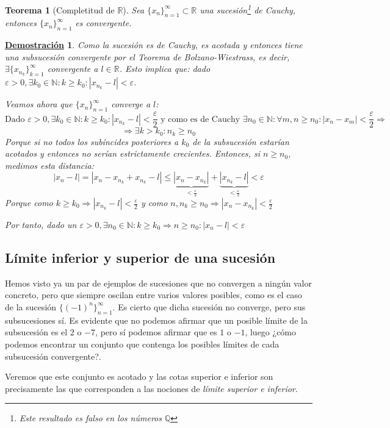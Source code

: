 \documentclass[10pt,a4paper,openright]{book}
\theoremstyle{break}
\newtheorem{theo}{Teorema}[chapter]
\newtheorem*{demo}{\underline{Demostración}}
\begin{document}
\begin{theo}[Completitud de $\mathbb R$]
Sea $\{x_n\}_{n=1}^\infty\subset \mathbb R$ una sucesión\footnote{Este resultado es falso en los números $\mathbb Q$} de Cauchy, entonces $\{x_n\}_{n=1}^\infty$ es convergente.
\end{theo}
\begin{demo}
Como la sucesión es de Cauchy, es acotada y entonces tiene una subsucesión convergente por el Teorema de Bolzano-Wiestrass, es decir, $\exists \{x_{n_k}\}_{k=1}^\infty$ convergente a $l\in \mathbb R$. Esto implica que: dado $\varepsilon>0, \exists k_0\in \mathbb N: k\geq k_0: |x_{n_k}-l|<\varepsilon$.\par

Veamos ahora que $\{x_n\}_{n=1}^\infty$ converge a $l$:
$$\mbox{Dado }\varepsilon>0, \exists k_0\in \mathbb N: k\geq k_0: |x_{n_k}-l|<\frac{\varepsilon}{2}\mbox{ y como es de Cauchy }\exists n_0\in\mathbb N: \forall m,n\geq n_0: |x_n-x_m|<\frac{\varepsilon}{2}\Rightarrow$$
$$\Rightarrow \exists k>k_0: n_k\geq n_0$$
Porque si no todos los subíncides posteriores a $k_0$ de la subsucesión estarían acotados y entonces no serían estrictamente crecientes.
Entonces, si $n\geq n_0$, medimos esta distancia:
$$|x_n-l|=|x_n-x_{n_k}+x_{n_k}-l|\leq \underbrace{|x_n-x_{n_k}|}_{< \frac{\varepsilon}{2}}+\underbrace{|x_{n_k}-l|}_{< \frac{\varepsilon}{2}}<\varepsilon$$
Porque como $k\geq k_0\Rightarrow |x_{n_k}-l|<\frac{\varepsilon}{2}$ y como $n,n_k\geq n_0\Rightarrow |x_n-x_{n_k}|<\frac{\varepsilon}{2}$

Por tanto, dado un $\varepsilon>0,\exists n_0\in \mathbb N: k\geq k_0\Rightarrow n\geq n_0: |x_n-l|<\varepsilon$
\end{demo}

\subsection{Límite inferior y superior de una sucesión}
Hemos visto ya un par de ejemplos de sucesiones que no convergen a ningún valor concreto, pero que siempre oscilan entre varios valores posibles, como es el caso de la sucesión $\{(-1)^n\}_{n=1}^\infty$. Es cierto que dicha sucesión no converge, pero sus subsucesiones sí. Es evidente que no podemos afirmar que un posible límite de la subsucesión es el $2$ o $-7$, pero sí podemos afirmar que es $1$ o $-1$, luego ¿cómo podemos encontrar un conjunto que contenga los posibles límites de cada subsucesión convergente?.

Veremos que este conjunto es acotado y las cotas superior e inferior son precisamente las que corresponden a las nociones de \textit{límite superior e inferior}.
\end{document}
